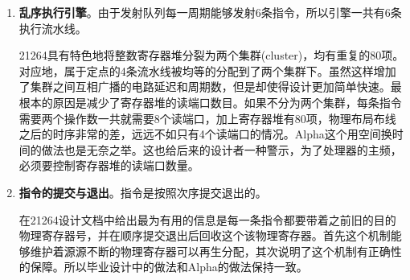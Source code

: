 \begin{enumerate}[label=(\alph*)]
	21264的取指宽度为4，也即一个周期最多能够取回4条指令。取回的指令先锁存一个周期，然后在CAM形式的重命名表中进行重命名和寄存器的分配。需要注意的是，和MIPS一样，Alpha在重命名阶段要特殊处理条件移动指令的映射关系。重命名完毕消除了写后写和读后写的冲突，但是依旧保留了写后读冲突。之后将指令写入发射队列中。发射队列采用分离式，分为定点指令队列和浮点指令队列，最多可以动态发射出六条指令，四条定点指令，两条浮点指令。使用记分牌来判断指令的操作数是否准备就绪。发射的细节上，微结构上有一个20项的定点队列和一个15项的浮点队列，队列只发射的是那些操作数都已经准备好的指令。与此同时，队列由仲裁器来决定填入新的指令。上述模块的逻辑可以由图\ref{fig:rename_21264}直观的描述。
	\begin{figure}[!htbp]
		\centering
		\texttt{[image: rename]}
		\label{fig:rename_21264}
	\end{figure}
	其中有一个Saved map state模块，非常重要，它的作用是在转移预测错误时恢复处理器的状态。注意该表有80项，也即每一条指令分配一项，这样处理器可以从任何一条指令之后精确地恢复状态，而不会受到跳转指令数量的约束。但是缺点是非常消耗资源。当然不光是转移预测错误的恢复，例外中断的状态恢复同样也是用这个表的，但和分支预测错误的恢复机制略有不同。
	\item \textbf{乱序执行引擎}。由于发射队列每一周期能够发射6条指令，所以引擎一共有6条执行流水线。
	
	21264具有特色地将整数寄存器堆分裂为两个集群(cluster)，均有重复的80项。对应地，属于定点的4条流水线被均等的分配到了两个集群下。虽然这样增加了集群之间互相广播的电路延迟和周期数，但是却使得设计更加简单快速。最根本的原因是减少了寄存器堆的读端口数目。如果不分为两个集群，每条指令需要两个操作数一共就需要8个读端口，加上寄存器堆有80项，物理布局布线之后的时序非常的差，远远不如只有4个读端口的情况。Alpha这个用空间换时间的做法也是无奈之举。这也给后来的设计者一种警示，为了处理器的主频，必须要控制寄存器堆的读端口数量。
	\item \textbf{指令的提交与退出}。指令是按照次序提交退出的。
	
	在21264设计文档中给出最为有用的信息是每一条指令都要带着之前旧的目的物理寄存器号，并在顺序提交退出后回收这个该物理寄存器。首先这个机制能够维护着源源不断的物理寄存器可以再生分配，其次说明了这个机制有正确性的保障。所以毕业设计中的做法和Alpha的做法保持一致。


\end{enumerate}
